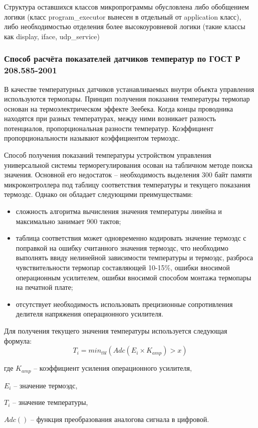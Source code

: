 Структура оставшихся классов микропрограммы обусловлена либо обобщением логики (класс program\_executor
вынесен в отдельный от application класс), либо необходимостью отделения более высокоуровневой логики
(такие классы как display, iface, udp\_service)



\subsubsection{Способ расчёта показателей датчиков температур по ГОСТ Р 208.585-2001}
В качестве температурных датчиков устанавливаемых внутри объекта управления используются
термопары. Принцип получения показания температуры термопар основан на
термоэлектрическом эффекте Зеебека. Когда концы проводника находятся при разных температурах,
между ними возникает разность потенциалов, пропорциональная разности температур.
Коэффициент пропорциональности называют коэффициентом термоэдс.

Способ получения показаний температуры устройством управления универсальной
системы терморегулирования осован на табличном методе поиска значения.
Основной его недостаток -- необходимость выделения 300 байт памяти микроконтроллера под
таблицу соответствия температуры и текущего показания термоэдс.
Однако он обладает следующими преимуществами:
\begin{itemize}
	\item{} сложность алгоритма вычисления значения температуры линейна и максимально занимает
		900 тактов;
	\item{} таблица соответствия может одновременно кодировать значение термоэдс с поправкой на
		ошибку считанного значения термоэдс, что необходимо выполнять ввиду нелинейной зависимости
		температуры и термоэдс, разброса чувствительности термопар составляющей 10-15\%, ошибки
		вносимой операционным усилителем, ошибки вносимой способом монтажа термопары на печатной плате;
	\item{} отсутствует необходимость использовать прецизионные сопротивления делителя
		напряжения операционного усилителя.
\end{itemize}

Для получения текущего значения температуры используется следующая формула:
\begin{equation}
	T_i = min_{tbl}(Adc(E_i \times{} K_{amp}) > x) 
\end{equation}
\begin{ESKDexplanation}
	\item[где ]{} $K_{amp}$ -- коэффициент усиления операционного усилителя,
	\item{} $E_i$ -- значение термоэдс,
	\item{} $T_i$ -- значение температуры,
	\item{} $Adc()$ -- функция преобразования аналогова сигнала в цифровой.
\end{ESKDexplanation}


